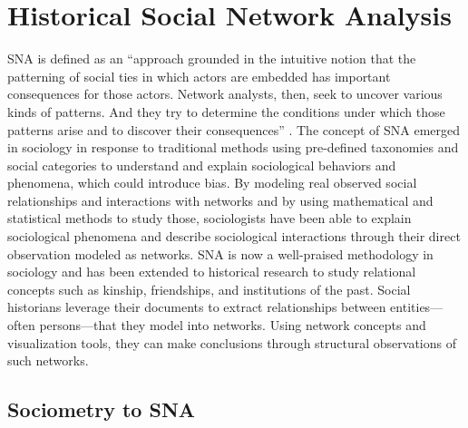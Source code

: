 \section{Historical Social Network Analysis}\label{sec:hsna}


SNA is defined as an ``approach grounded in the intuitive notion that the patterning of social ties in which actors are embedded has important consequences for those actors. Network analysts, then, seek to uncover various kinds of patterns. And they try to determine the conditions under which those patterns arise and to discover their consequences'' \cite{freeman_development_2004}.
The concept of SNA emerged in sociology in response to traditional methods using pre-defined taxonomies and social categories to understand and explain sociological behaviors and phenomena, which could introduce bias.
By modeling real observed social relationships and interactions with networks and by using mathematical and statistical methods to study those, sociologists have been able to explain sociological phenomena and describe sociological interactions through their direct observation modeled as networks.
SNA is now a well-praised methodology in sociology and has been extended to historical research to study relational concepts such as kinship, friendships, and institutions of the past.
Social historians leverage their documents to extract relationships between entities---often persons---that they model into networks.
Using network concepts and visualization tools, they can make conclusions through structural observations of such networks.




\subsection{Sociometry to SNA}

